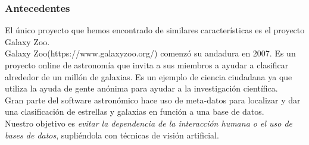 	\subsubsection{Antecedentes }
	
	El único proyecto que hemos encontrado de similares características	es el proyecto Galaxy Zoo. \\
	Galaxy Zoo(https://www.galaxyzoo.org/) comenzó su andadura en 2007. Es un proyecto online de astronomía que invita a sus miembros a ayudar a clasificar alrededor de un millón de galaxias. Es un ejemplo de ciencia ciudadana ya que utiliza la ayuda de gente anónima para ayudar a la investigación científica. \\
	Gran parte del software astronómico hace uso de meta-datos para localizar y dar una clasificación de estrellas y galaxias en función a una base de datos. \\
	Nuestro objetivo es \textit{evitar la dependencia de la interacción humana o el uso de bases de datos}, supliéndola con técnicas de visión artificial.\\

